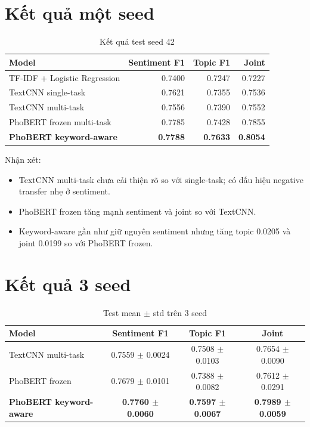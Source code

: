 \documentclass[12pt,a4paper]{report}
\begin{document}
\section{Kết quả một seed}

\begin{table}[H]
\centering
\caption{Kết quả test seed 42}
\begin{tabular}{@{}lrrr@{}}
\toprule
\textbf{Model} & \textbf{Sentiment F1} & \textbf{Topic F1} & \textbf{Joint} \\
\midrule
TF-IDF + Logistic Regression & 0.7400 & 0.7247 & 0.7227 \\
TextCNN single-task & 0.7621 & 0.7355 & 0.7536 \\
TextCNN multi-task & 0.7556 & 0.7390 & 0.7552 \\
PhoBERT frozen multi-task & 0.7785 & 0.7428 & 0.7855 \\
\textbf{PhoBERT keyword-aware} & \textbf{0.7788} & \textbf{0.7633} & \textbf{0.8054} \\
\bottomrule
\end{tabular}
\end{table}

Nhận xét:

\begin{itemize}[leftmargin=1.2cm]
  \item TextCNN multi-task chưa cải thiện rõ so với single-task; có dấu hiệu negative transfer nhẹ ở sentiment.
  \item PhoBERT frozen tăng mạnh sentiment và joint so với TextCNN.
  \item Keyword-aware gần như giữ nguyên sentiment nhưng tăng topic 0.0205 và joint 0.0199 so với PhoBERT frozen.
\end{itemize}

\section{Kết quả 3 seed}

\begin{table}[H]
\centering
\caption{Test mean \(\pm\) std trên 3 seed}
\begin{tabular}{@{}lccc@{}}
\toprule
\textbf{Model} & \textbf{Sentiment F1} & \textbf{Topic F1} & \textbf{Joint} \\
\midrule
TextCNN multi-task & 0.7559 \(\pm\) 0.0024 & 0.7508 \(\pm\) 0.0103 & 0.7654 \(\pm\) 0.0090 \\
PhoBERT frozen & 0.7679 \(\pm\) 0.0101 & 0.7388 \(\pm\) 0.0082 & 0.7612 \(\pm\) 0.0291 \\
\textbf{PhoBERT keyword-aware} & \textbf{0.7760 \(\pm\) 0.0060} & \textbf{0.7597 \(\pm\) 0.0067} & \textbf{0.7989 \(\pm\) 0.0059} \\
\bottomrule
\end{tabular}
\end{table}
\end{document}

